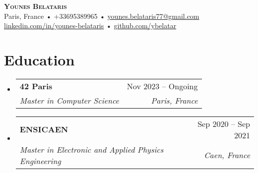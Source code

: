 \documentclass[letterpaper,11pt]{article}
\makeatletter
\newcommand{\resumeItem}[1]{
  \item\small{
    {#1 \vspace{-2pt}}
  }
}
\newcommand{\resumeSubheading}[4]{
  \vspace{-2pt}\item
    \begin{tabular*}{0.97\textwidth}[t]{l@{\extracolsep{\fill}}r}
      \textbf{#1} & #2 \\
      \textit{\small#3} & \textit{\small #4} \\
    \end{tabular*}\vspace{-7pt}
}
\newcommand{\resumeSubHeadingListStart}{\begin{itemize}[leftmargin=0.15in, label={}]}
\newcommand{\resumeSubHeadingListEnd}{\end{itemize}}
\newcommand{\resumeItemListStart}{\begin{itemize}}
\newcommand{\resumeItemListEnd}{\end{itemize}\vspace{-5pt}}
\makeatother
\begin{document}

\begin{center}
    \textbf{\Huge \scshape Younes Belataris} \\ \vspace{6pt}
    \small Paris, France  \hspace{2mm}•\hspace{2mm}   +33695389965   \hspace{2mm}•\hspace{2mm}   \href{younes.belataris77@gmail.com}{{younes.belataris77@gmail.com}} \\
    \href{https://linkedin.com/in/younes-belataris-65752a301}{{linkedin.com/in/younes-belataris}} \hspace{2mm}•\hspace{2mm}
    \href{https://github.com/ybelatar}{{github.com/ybelatar}}
\end{center}


\section{Education}
    \vspace{3pt}
  \resumeSubHeadingListStart
    \resumeSubheading
      {42 Paris}{Nov 2023 -- Ongoing}
      {Master in Computer Science}{Paris, France}
    \resumeSubheading
      {ENSICAEN}{Sep 2020 -- Sep 2021}
      {Master in Electronic and Applied Physics Engineering}{Caen, France}
  \resumeSubHeadingListEnd



      
\end{document}
